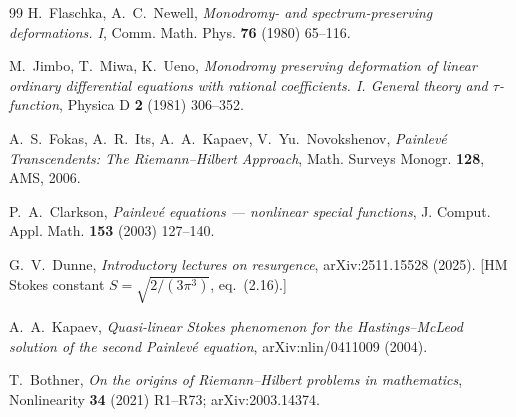 \documentclass[11pt,reqno]{amsart}
\theoremstyle{plain}
\theoremstyle{definition}
\theoremstyle{remark}
\begin{document}
\begin{thebibliography}{99}
 H.~Flaschka, A.~C.~Newell, \emph{Monodromy- and spectrum-preserving deformations.
I}, Comm. Math. Phys. \textbf{76} (1980) 65--116.

 M.~Jimbo, T.~Miwa, K.~Ueno, \emph{Monodromy preserving deformation of linear
ordinary differential equations with rational coefficients. I. General theory and $\tau$-function},
Physica D \textbf{2} (1981) 306--352.

 A.~S.~Fokas, A.~R.~Its, A.~A.~Kapaev, V.~Yu.~Novokshenov, \emph{Painlev\'e
Transcendents: The Riemann--Hilbert Approach}, Math. Surveys Monogr. \textbf{128}, AMS, 2006.

 P.~A.~Clarkson, \emph{Painlev\'e equations --- nonlinear special functions},
J. Comput. Appl. Math. \textbf{153} (2003) 127--140.

 G.~V.~Dunne, \emph{Introductory lectures on resurgence}, arXiv:2511.15528
(2025). [HM Stokes constant $S=\sqrt{2/(3\pi^3)}$, eq.~(2.16).]

 A.~A.~Kapaev, \emph{Quasi-linear Stokes phenomenon for the Hastings--McLeod
solution of the second Painlev\'e equation}, arXiv:nlin/0411009 (2004).

 T.~Bothner, \emph{On the origins of Riemann--Hilbert problems in mathematics},
Nonlinearity \textbf{34} (2021) R1--R73; arXiv:2003.14374.

\end{thebibliography}
\end{document}

